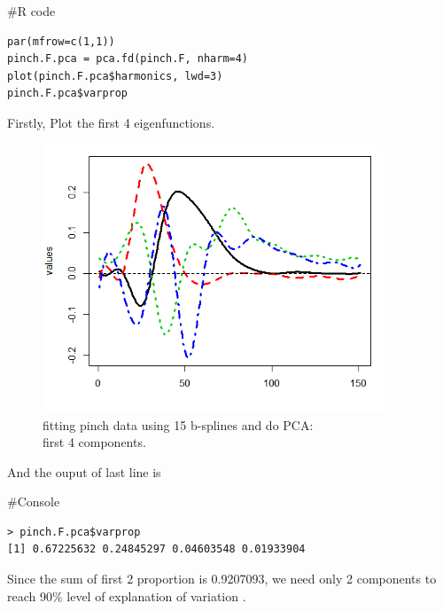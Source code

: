 \documentclass{article}
\newenvironment{Rcode}%
{%
    \begin{mdframed}
    \#R code
    \begin{small}
}
{%
    \end{small}
    \end{mdframed}
}
\newenvironment{console}%
{%
    \begin{mdframed}
    \#Console
    \begin{small}
}
{%
    \end{small}
    \end{mdframed}
}
\begin{document}
\begin{Rcode}
    \begin{verbatim}
par(mfrow=c(1,1))
pinch.F.pca = pca.fd(pinch.F, nharm=4)
plot(pinch.F.pca$harmonics, lwd=3)
pinch.F.pca$varprop
    \end{verbatim}
\end{Rcode}

Firstly, Plot the first 4 eigenfunctions.

\begin{figure}[hh]
    \centering
    \includegraphics[height=8cm]{pinch_F_pca_4components_plot.png}
    \caption{fitting pinch data using 15 b-splines and do PCA: \\ first 4 components.}
\end{figure}

And the ouput of last line is

\begin{console}
    \begin{verbatim}
> pinch.F.pca$varprop
[1] 0.67225632 0.24845297 0.04603548 0.01933904
    \end{verbatim}
\end{console}

Since the sum of first 2 proportion is 0.9207093, we need only 2 components to reach 90\% level of explanation of variation .
\end{document}
